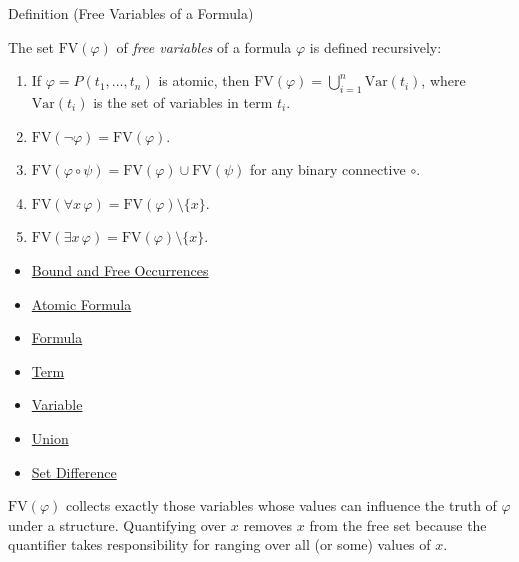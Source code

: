 \begin{definitionbox}{Definition (Free Variables of a Formula)}
\begin{definition}\label{def:fv}
The set $\mathrm{FV}(\varphi)$ of \emph{free variables} of a formula $\varphi$
is defined recursively:
\begin{enumerate}
  \item If $\varphi = P(t_1,\dots,t_n)$ is atomic, then
  $\mathrm{FV}(\varphi) = \bigcup_{i=1}^n \mathrm{Var}(t_i)$,
  where $\mathrm{Var}(t_i)$ is the set of variables in term $t_i$.

  \item $\mathrm{FV}(\neg \varphi) = \mathrm{FV}(\varphi)$.

  \item $\mathrm{FV}(\varphi \circ \psi) = \mathrm{FV}(\varphi) \cup \mathrm{FV}(\psi)$
  for any binary connective $\circ$.

  \item $\mathrm{FV}(\forall x\,\varphi) = \mathrm{FV}(\varphi) \setminus \{x\}$.

  \item $\mathrm{FV}(\exists x\,\varphi) = \mathrm{FV}(\varphi) \setminus \{x\}$.
\end{enumerate}
\end{definition}
\end{definitionbox}

\begin{dependencies}
\begin{itemize}
  \item \hyperref[def:bound-free]{Bound and Free Occurrences}
  \item \hyperref[def:atomic-formula]{Atomic Formula}
  \item \hyperref[def:formula]{Formula}
  \item \hyperref[def:term]{Term}
  \item \hyperref[def:variable]{Variable}
  \item \hyperref[def:union]{Union}
  \item \hyperref[def:set-difference]{Set Difference}
\end{itemize}
\end{dependencies}

\begin{remark*}
$\mathrm{FV}(\varphi)$ collects exactly those variables whose values can
influence the truth of $\varphi$ under a structure. Quantifying over $x$
removes $x$ from the free set because the quantifier takes responsibility for
ranging over all (or some) values of $x$.
\end{remark*}

